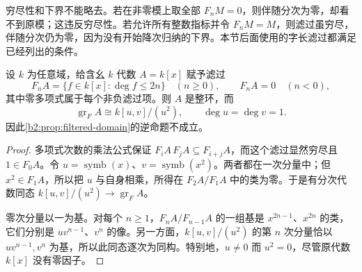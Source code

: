 穷尽性和下界不能略去。若在非零模上取全部 \(F_nM=0\)，则伴随分次为零，却看不到原模；这违反穷尽性。若允许所有整数指标并令 \(F_nM=M\)，则滤过虽穷尽，伴随分次仍为零，因为没有开始降次归纳的下界。本节后面使用的字长滤过都满足已经列出的条件。

\begin{proposition}\label{b2:prop:filtered-domain-converse-failure}
	设 \(k\) 为任意域，给含幺 \(k\) 代数 \(A=k[x]\) 赋予滤过
	\[
		F_nA=\{f\in k[x]:\deg f\le 2n\}\quad(n\ge0), \qquad F_nA=0\quad(n<0),
	\]
	其中零多项式属于每个非负滤过项。则 \(A\) 是整环，而
	\[
		\operatorname{gr}_F A\cong k[u,v]/(u^2), \qquad \deg u=\deg v=1.
	\]
	因此\cref{b2:prop:filtered-domain}的逆命题不成立。
\end{proposition}
\begin{proof}
	多项式次数的乘法公式保证 \(F_iA\,F_jA\subseteq F_{i+j}A\)，而这个滤过显然穷尽且 \(1\in F_0A\)。令 \(u=\operatorname{symb}(x)\)、\(v=\operatorname{symb}(x^2)\)。两者都在一次分量中；但 \(x^2\in F_1A\)，所以把 \(u\) 与自身相乘，所得在 \(F_2A/F_1A\) 中的类为零。于是有分次代数同态 \(k[u,v]/(u^2)\to\operatorname{gr}_F A\)。

	零次分量以一为基。对每个 \(n\ge1\)，\(F_nA/F_{n-1}A\) 的一组基是 \(x^{2n-1}\)、\(x^{2n}\) 的类，它们分别是 \(uv^{n-1}\)、\(v^n\) 的像。另一方面，\(k[u,v]/(u^2)\) 的第 \(n\) 次分量恰以 \(uv^{n-1},v^n\) 为基，所以此同态逐次为同构。特别地，\(u\ne0\) 而 \(u^2=0\)，尽管原代数 \(k[x]\) 没有零因子。
\end{proof}

